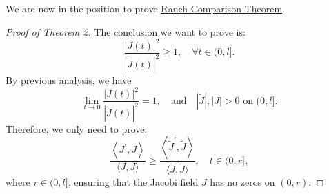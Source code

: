 \documentclass{ctexart}
\begin{document}
We are now in the position to prove \underline{\hyperref[RCT]{Rauch Comparison Theorem}}.
\begin{proof}[Proof of Theorem 2]
  The conclusion we want to prove is:
  $$
  \frac{|J(t)|^2}{|\tilde{J}(t)|^2} \geq 1, \quad \forall t \in (0, l].
  $$
  By \underline{\hyperlink{GSpre}{previous analysis}}, we have 
  $$
  \lim _{t \rightarrow 0} \frac{|J(t)|^2}{|\tilde{J}(t)|^2}=1, \quad \text{and} \quad |\tilde{J}|, |J| > 0 \text{ on } (0, l].
  $$
  Therefore, we only need to prove:
  $$
  \frac{\left\langle J^{\prime}, J\right\rangle}{\langle J, J\rangle} \geq \frac{\left\langle\tilde{J}^{\prime}, \tilde{J}\right\rangle}{\langle\tilde{J}, \tilde{J}\rangle}, \quad t \in (0, r],
  $$
  where $r \in (0, l]$, ensuring that the Jacobi field $J$ has no zeros on $(0, r)$.
  

\end{proof}
\end{document}
